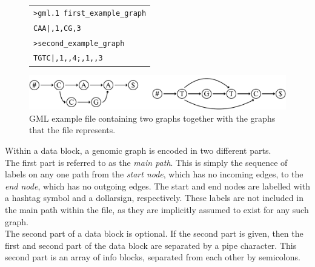 \documentclass[a4paper,12pt,twoside,BCOR=10mm]{scrbook}
\begin{document}
\begin{figure}[!htb]
\centering
\begin{tabularx}{1.0\textwidth}{ | X | }
\hline
\texttt{>gml.1 first\_example\_graph} \\
\texttt{CAA|,1,CG,3} \\
\texttt{>second\_example\_graph} \\
\texttt{TGTC|,1,,4;,1,,3} \\
\hline
\end{tabularx}
\includegraphics[width=\textwidth]{evo_fig_second_gml_example.pdf}
\caption[GML example file containing two graphs]{GML example file containing two graphs together with the graphs that the file represents.} \label{fig:evo_fig_second_gml_example}
\end{figure}

Within a data block, a genomic graph is encoded in two different parts. \\
The first part is referred to as the \textit{main path}.
This is simply the sequence of labels on any one path from the \textit{start node},
which has no incoming edges, to the \textit{end node}, which has no outgoing edges.
The start and end nodes are labelled with a hashtag symbol and a dollarsign, respectively.
These labels are not included in the main path within the file, as they are implicitly assumed
to exist for any such graph. \\
The second part of a data block is optional.
If the second part is given, then the first and second part of the data block are separated by a pipe character.
This second part is an array of info blocks, separated from each other by semicolons.
\end{document}

